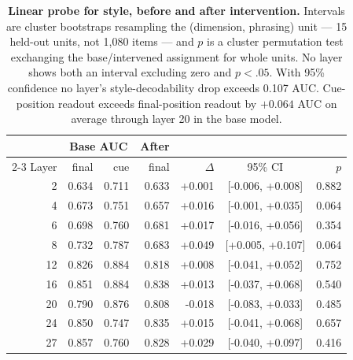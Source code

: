 \begin{table}[t]\centering\footnotesize
\setlength{\tabcolsep}{2.6pt}
\begin{tabular}{@{}rrrrrcr@{}}
\toprule
& \multicolumn{2}{c}{Base AUC} & After & & & \\
\cmidrule(lr){2-3}
Layer & final & cue & final & $\Delta$ & 95\% CI & $p$ \\
\midrule
2 & 0.634 & 0.711 & 0.633 & +0.001 & [-0.006, +0.008] & 0.882 \\
4 & 0.673 & 0.751 & 0.657 & +0.016 & [-0.001, +0.035] & 0.064 \\
6 & 0.698 & 0.760 & 0.681 & +0.017 & [-0.016, +0.056] & 0.354 \\
8 & 0.732 & 0.787 & 0.683 & +0.049 & [+0.005, +0.107] & 0.064 \\
12 & 0.826 & 0.884 & 0.818 & +0.008 & [-0.041, +0.052] & 0.752 \\
16 & 0.851 & 0.884 & 0.838 & +0.013 & [-0.037, +0.068] & 0.540 \\
20 & 0.790 & 0.876 & 0.808 & -0.018 & [-0.083, +0.033] & 0.485 \\
24 & 0.850 & 0.747 & 0.835 & +0.015 & [-0.041, +0.068] & 0.657 \\
27 & 0.857 & 0.760 & 0.828 & +0.029 & [-0.040, +0.097] & 0.416 \\
\bottomrule
\end{tabular}
\caption{\textbf{Linear probe for style, before and after intervention.} Intervals are cluster bootstraps
resampling the (dimension, phrasing) unit --- 15 held-out units, not 1{,}080 items --- and $p$ is a cluster
permutation test exchanging the base/intervened assignment for whole units. No layer shows both an interval
excluding zero and $p<.05$. With 95\% confidence no layer's style-decodability drop exceeds 0.107 AUC.
Cue-position readout exceeds final-position readout by $+0.064$ AUC on average through layer 20 in the base
model.}
\label{tab:probe}
\end{table}
